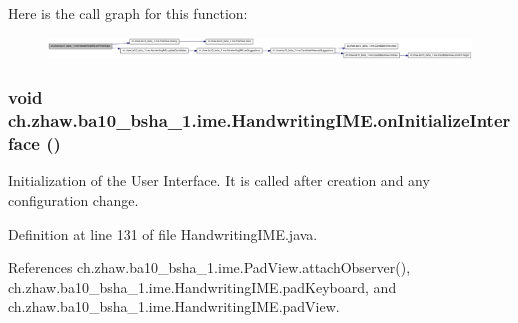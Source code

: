 Here is the call graph for this function:\nopagebreak
\begin{figure}[H]
\begin{center}
\leavevmode
\includegraphics[width=420pt]{classch_1_1zhaw_1_1ba10__bsha__1_1_1ime_1_1HandwritingIME_a1b167f4b94b905a354b0713f15ef4a92_cgraph}
\end{center}
\end{figure}
\hypertarget{classch_1_1zhaw_1_1ba10__bsha__1_1_1ime_1_1HandwritingIME_a113e6d863b481e5a9c926dd917d7822a}{
\subsubsection[{onInitializeInterface}]{\setlength{\rightskip}{0pt plus 5cm}void ch.zhaw.ba10\_\-bsha\_\-1.ime.HandwritingIME.onInitializeInterface ()}}
\label{classch_1_1zhaw_1_1ba10__bsha__1_1_1ime_1_1HandwritingIME_a113e6d863b481e5a9c926dd917d7822a}
Initialization of the User Interface. It is called after creation and any configuration change. 

Definition at line 131 of file HandwritingIME.java.

References ch.zhaw.ba10\_\-bsha\_\-1.ime.PadView.attachObserver(), ch.zhaw.ba10\_\-bsha\_\-1.ime.HandwritingIME.padKeyboard, and ch.zhaw.ba10\_\-bsha\_\-1.ime.HandwritingIME.padView.

